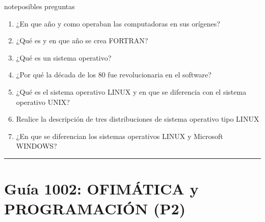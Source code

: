 \documentclass[letterpaper,10pt,spanish]{sphinxmanual}
\begin{document}
\begin{sphinxadmonition}{note}{posibles preguntas}
\begin{enumerate}
\item {} 
\sphinxAtStartPar
¿En que año y como operaban las computadoras en sus orígenes?

\item {} 
\sphinxAtStartPar
¿Qué es y en que año se crea FORTRAN?

\item {} 
\sphinxAtStartPar
¿Qué es un sistema operativo?

\item {} 
\sphinxAtStartPar
¿Por qué la década de los 80 fue revolucionaria en el software?

\item {} 
\sphinxAtStartPar
¿Qué es el sistema operativo LINUX y en que se diferencia con el sistema operativo UNIX?

\item {} 
\sphinxAtStartPar
Realice la descripción de tres distribuciones de sistema operativo tipo LINUX

\item {} 
\sphinxAtStartPar
¿En que se diferencian los sistemas operativos LINUX y Microsoft WINDOWS?

\end{enumerate}
\end{sphinxadmonition}


\bigskip\hrule\bigskip


\sphinxstepscope


\section{Guía 1002: OFIMÁTICA y PROGRAMACIÓN (P2)}
\label{\detokenize{1_guias/10informatica/G1002:guia-1002-ofimatica-y-programacion-p2}}\label{\detokenize{1_guias/10informatica/G1002::doc}}
\end{document}
